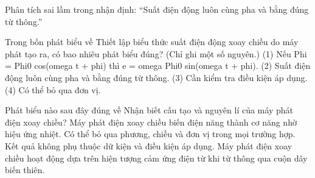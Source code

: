 \begin{bt}
Phân tích sai lầm trong nhận định: “Suất điện động luôn cùng pha và bằng đúng từ thông.”
\end{bt}

\begin{ex}
Trong bốn phát biểu về Thiết lập biểu thức suất điện động xoay chiều do máy phát tạo ra, có bao nhiêu phát biểu đúng? (Chỉ ghi một số nguyên.) (1) Nếu Phi = Phi0 cos(omega t + phi) thì e = omega Phi0 sin(omega t + phi). (2) Suất điện động luôn cùng pha và bằng đúng từ thông. (3) Cần kiểm tra điều kiện áp dụng. (4) Có thể bỏ qua đơn vị.
\end{ex}

\begin{ex}
Phát biểu nào sau đây đúng về Nhận biết cấu tạo và nguyên lí của máy phát điện xoay chiều?
\choice
{Máy phát điện xoay chiều biến điện năng thành cơ năng nhờ hiệu ứng nhiệt.}
{Có thể bỏ qua phương, chiều và đơn vị trong mọi trường hợp.}
{Kết quả không phụ thuộc dữ kiện và điều kiện áp dụng.}
{\True Máy phát điện xoay chiều hoạt động dựa trên hiện tượng cảm ứng điện từ khi từ thông qua cuộn dây biến thiên.}
\end{ex}

